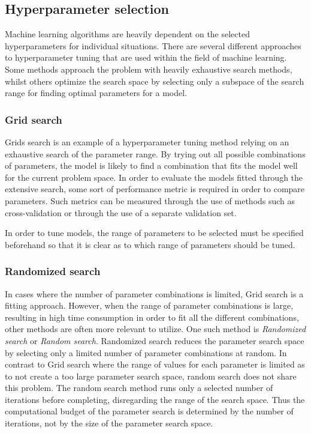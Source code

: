 \subsection{Hyperparameter selection}
\label{section:BT:Hyperparameters}

Machine learning algorithms are heavily dependent on the selected hyperparameters for individual situations.
There are several different approaches to hyperparameter tuning that are used within the field of machine learning.
Some methods approach the problem with heavily exhaustive search methods,
whilst others optimize the search space by selecting only a subspace of the search range for finding optimal parameters for a model.

\subsubsection{Grid search}
Grids search is an example of a hyperparameter tuning method relying on an exhaustive search of the parameter range.
By trying out all possible combinations of parameters, the model is likely to find a combination that fits the model well for the current problem space.
In order to evaluate the models fitted through the extensive search, some sort of performance metric is required in order to compare parameters.
Such metrics can be measured through the use of methods such as cross-validation or through the use of a separate validation set.

In order to tune models, the range of parameters to be selected must be specified beforehand so that it is clear as to which range of parameters should be tuned.
\cite{Geron2017}


\subsubsection{Randomized search}
In cases where the number of parameter combinations is limited, Grid search is a fitting approach.
However, when the range of parameter combinations is large, resulting in high time consumption in order to fit all the different combinations,
other methods are often more relevant to utilize.
One such method is \textit{Randomized search} or \textit{Random search}.
Randomized search reduces the parameter search space by selecting only a limited number of parameter combinations at random.
In contrast to Grid search where the range of values for each parameter is limited as to not create a too large parameter search space,
random search does not share this problem.
The random search method runs only a selected number of iterations before completing, disregarding the range of the search space.
Thus the computational budget of the parameter search is determined by the number of iterations, not by the size of the parameter search space.
\cite{Geron2017}



